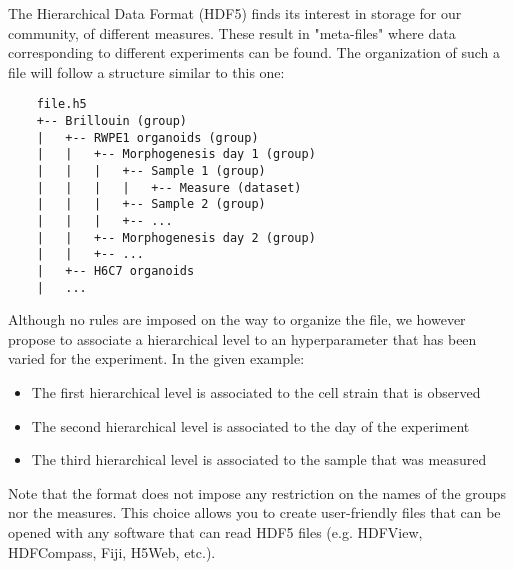 The Hierarchical Data Format (HDF5) finds its interest in storage for our community, of different measures. These result in "meta-files" where data corresponding to different experiments can be found. The organization of such a file will follow a structure similar to this one:

\begin{verbatim}
    file.h5
    +-- Brillouin (group)
    |   +-- RWPE1 organoids (group)
    |   |   +-- Morphogenesis day 1 (group)
    |   |   |   +-- Sample 1 (group)
    |   |   |   |   +-- Measure (dataset)
    |   |   |   +-- Sample 2 (group)
    |   |   |   +-- ...
    |   |   +-- Morphogenesis day 2 (group)
    |   |   +-- ...
    |   +-- H6C7 organoids
    |   ...
\end{verbatim}

Although no rules are imposed on the way to organize the file, we however propose to associate a hierarchical level to an hyperparameter that has been varied for the experiment. In the given example:
\begin{itemize}
    \item The first hierarchical level is associated to the cell strain that is observed
    \item The second hierarchical level is associated to the day of the experiment
    \item The third hierarchical level is associated to the sample that was measured
\end{itemize}

Note that the format does not impose any restriction on the names of the groups nor the measures. This choice allows you to create user-friendly files that can be opened with any software that can read HDF5 files (e.g. HDFView, HDFCompass, Fiji, H5Web, etc.).